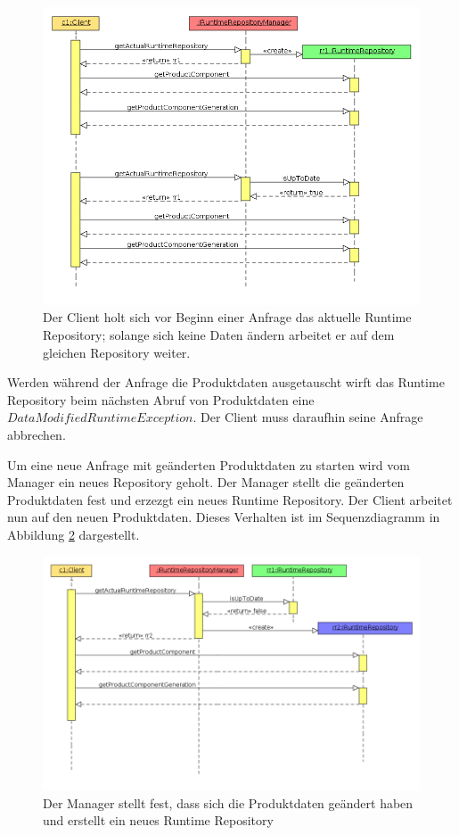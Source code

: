 \documentclass[headsepline=true, footsepline=true]{scrartcl}
\begin{document}
\begin{figure}[htb] \centering
\includegraphics[width=13cm]{./pics/clientSequenceEasy.png} \caption{Der Client
holt sich vor Beginn einer Anfrage das aktuelle Runtime Repository; solange sich
keine Daten ändern arbeitet er auf dem gleichen Repository weiter.}
\label{clientSequenceEasy}
\end{figure}

Werden während der Anfrage die Produktdaten ausgetauscht wirft das Runtime
Repository beim nächsten Abruf von
Produktdaten eine $DataModifiedRuntimeException$. Der Client muss
daraufhin seine Anfrage abbrechen.

Um eine neue Anfrage mit geänderten Produktdaten zu starten wird vom Manager ein
neues Repository geholt. Der Manager stellt die geänderten Produktdaten
fest und erzezgt ein neues Runtime Repository. Der Client arbeitet nun auf
den neuen Produktdaten. Dieses Verhalten ist
im Sequenzdiagramm in Abbildung \ref{clientSequenceChange} dargestellt.

\begin{figure}[htb] \centering
\includegraphics[width=\textwidth]{./pics/clientSequenceChange.png} \caption{Der
Manager stellt fest, dass sich die Produktdaten geändert haben und erstellt ein
neues Runtime Repository}
\label{clientSequenceChange}
\end{figure}
\end{document}
